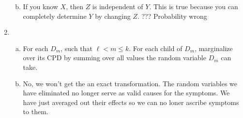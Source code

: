 \documentclass[12pt]{article}
\begin{document}
\begin{enumerate}
\begin{enumerate}[(a)]
\begin{tabular}{c||c c c c}
							\end{tabular}
						\item If you know $X$, then $Z$ is independent of $Y$. This is true because you can completely determine $Y$ by changing $Z$. ??? Probability wrong
					\end{enumerate}
				\item 
					\begin{enumerate}[(a)]
							\item For each $D_m$, such that $\ell < m \leq k$. For each child of $D_m$, marginalize over its CPD by summing over all values the random variable $D_m$ can take. 
							\item No, we won't get the an exact transformation. The random variables we have eliminated no longer serve as valid causes for the symptoms. We have just averaged out their effects so we can no loner ascribe symptoms to them.						
			
					\end{enumerate}
		\end{enumerate}
\end{document}
